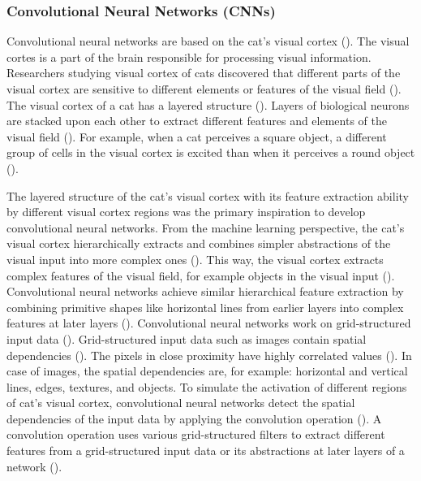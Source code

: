 \documentclass{BachelorBUI}
\begin{document}
        \subsubsection{Convolutional Neural Networks (CNNs)}
        \label{subsub:convolutional-neural-networks}

        Convolutional neural networks are based on the cat's visual cortex (\cite{Aggarwal:2018}). The visual cortes is a part of the brain responsible for processing visual information. Researchers studying visual cortex of cats discovered that different parts of the visual cortex are sensitive to different elements or features of the visual field (\cite{Aggarwal:2018}). The visual cortex of a cat has a layered structure (\cite{Aggarwal:2018}). Layers of biological neurons are stacked upon each other to extract different features and elements of the visual field (\cite{Aggarwal:2018}). For example, when a cat perceives a square object, a different group of cells in the visual cortex is excited than when it perceives a round object (\cite{Aggarwal:2018}).

        The layered structure of the cat's visual cortex with its feature extraction ability by different visual cortex regions was the primary inspiration to develop convolutional neural networks. From the machine learning perspective, the cat's visual cortex hierarchically extracts and combines simpler abstractions of the visual input into more complex ones (\cite{Aggarwal:2018}). This way, the visual cortex extracts complex features of the visual field, for example objects in the visual input (\cite{Aggarwal:2018}). Convolutional neural networks achieve similar hierarchical feature extraction by combining primitive shapes like horizontal lines from earlier layers into complex features at later layers (\cite{Aggarwal:2018}). Convolutional neural networks work on grid-structured input data (\cite{Aggarwal:2018}). Grid-structured input data such as images contain spatial dependencies (\cite{Aggarwal:2018}). The pixels in close proximity have highly correlated values (\cite{Bishop:2024}). In case of images, the spatial dependencies are, for example: horizontal and vertical lines, edges, textures, and objects. To simulate the activation of different regions of cat's visual cortex, convolutional neural networks detect the spatial dependencies of the input data by applying the convolution operation (\cite{Aggarwal:2018}). A convolution operation uses various grid-structured filters to extract different features from a grid-structured input data or its abstractions at later layers of a network (\cite{Aggarwal:2018}).
\end{document}
